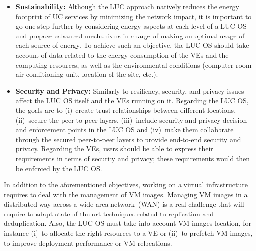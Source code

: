 \begin{itemize}
\item \textbf{Sustainability:} Although the LUC approach natively reduces the energy
  footprint of UC services by minimizing the network impact,  it is important to go one step further by
  considering energy aspects at each level of a LUC OS and propose advanced mechanisms in
  charge of making an optimal usage of each source of energy.
  To achieve such an objective, the LUC OS should take account of data related to the
  energy consumption of the VEs and the computing resources, as well as the environmental
  conditions (computer room air conditioning unit, location of the site, etc.).
\item \textbf{Security and Privacy:} Similarly to resiliency, security, and privacy issues
  affect the LUC OS itself and the VEs running on it. Regarding the LUC OS, the goals are
  to (i)~create trust relationships between different locations, (ii)~secure the
  peer-to-peer layers, (iii)~include security and privacy decision and enforcement points
  in the LUC OS and (iv)~make them collaborate through the secured peer-to-peer layers to
  provide end-to-end security and privacy.
  Regarding the VEs, users should be able to express their requirements in terms of
  security and privacy; these requirements would then be enforced by the LUC OS.


\end{itemize}

In addition to the aforementioned objectives, working on a virtual infrastructure requires
to deal with the management of VM images. Managing VM images in a distributed way across a
wide area network~(WAN) is a real challenge that will require to adapt state-of-the-art
techniques related to replication and deduplication. Also, the LUC OS must take into
account VM images location, for instance (i)~to allocate the right resources to a VE or
(ii)~to prefetch VM images, to improve deployment performance or VM relocations.

